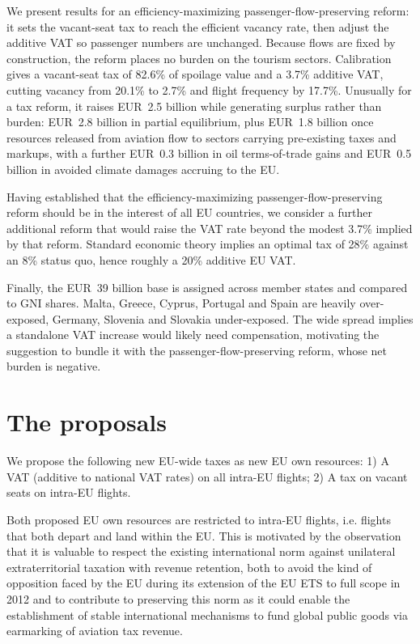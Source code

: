 \documentclass[../../main]{subfiles}
\begin{document}
We present results for an efficiency-maximizing passenger-flow-preserving reform: it sets the vacant-seat tax to reach the efficient vacancy rate, then adjust the additive VAT so passenger numbers are unchanged. Because flows are fixed by construction, the reform places no burden on the tourism sectors. Calibration gives a vacant-seat tax of 82.6\% of spoilage value and a 3.7\% additive VAT, cutting vacancy from 20.1\% to 2.7\% and flight frequency by 17.7\%. Unusually for a tax reform, it raises EUR~2.5 billion while generating surplus rather than burden: EUR~2.8 billion in partial equilibrium, plus EUR~1.8 billion once resources released from aviation flow to sectors carrying pre-existing taxes and markups, with a further EUR~0.3 billion in oil terms-of-trade gains and EUR~0.5 billion in avoided climate damages accruing to the EU.

Having established that the efficiency-maximizing passenger-flow-preserving reform should be in the interest of all EU countries, we consider a further additional reform that would raise the VAT rate beyond the modest 3.7\% implied by that reform. Standard economic theory implies an optimal tax of 28\% against an 8\% status quo, hence roughly a 20\% additive EU VAT.

Finally, the EUR~39 billion base is assigned across member states and compared to GNI shares. Malta, Greece, Cyprus, Portugal and Spain are heavily over-exposed, Germany, Slovenia and Slovakia under-exposed. The wide spread implies a standalone VAT increase would likely need compensation, motivating the suggestion to bundle it with the passenger-flow-preserving reform, whose net burden is negative.


\section{The proposals}

We propose the following new EU-wide taxes as new EU own resources:
1) A VAT (additive to national VAT rates) on all intra-EU flights;
2) A tax on vacant seats on intra-EU flights.

Both proposed EU own resources are restricted to intra-EU flights, i.e. flights that both depart and land within the EU. This is motivated by the observation that it is valuable to respect the existing international norm against unilateral extraterritorial taxation with revenue retention, both to avoid the kind of opposition faced by the EU during its extension of the EU ETS to full scope in 2012 and to contribute to preserving this norm as it could enable the establishment of stable international mechanisms to fund global public goods via earmarking of aviation tax revenue.
\end{document}
